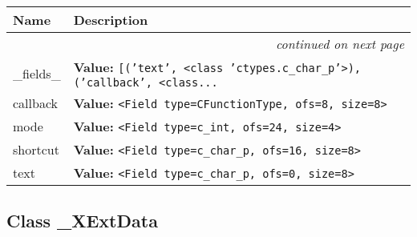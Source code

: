     \vspace{-1cm}
\hspace{\varindent}\begin{longtable}{|p{\varnamewidth}|p{\vardescrwidth}|l}
\cline{1-2}
\cline{1-2} \centering \textbf{Name} & \centering \textbf{Description}& \\
\cline{1-2}
\endhead\cline{1-2}\multicolumn{3}{r}{\small\textit{continued on next page}}\\\endfoot\cline{1-2}
\endlastfoot\raggedright \_\-f\-i\-e\-l\-d\-s\-\_\- & \raggedright \textbf{Value:} 
{\tt \texttt{[}\texttt{(}\texttt{'}\texttt{text}\texttt{'}\texttt{, }{\textless}class 'ctypes.c\_char\_p'{\textgreater}\texttt{)}\texttt{, }\texttt{(}\texttt{'}\texttt{callback}\texttt{'}\texttt{, }{\textless}class\texttt{...}}&\\
\cline{1-2}
\raggedright c\-a\-l\-l\-b\-a\-c\-k\- & \raggedright \textbf{Value:} 
{\tt {\textless}Field type=CFunctionType, ofs=8, size=8{\textgreater}}&\\
\cline{1-2}
\raggedright m\-o\-d\-e\- & \raggedright \textbf{Value:} 
{\tt {\textless}Field type=c\_int, ofs=24, size=4{\textgreater}}&\\
\cline{1-2}
\raggedright s\-h\-o\-r\-t\-c\-u\-t\- & \raggedright \textbf{Value:} 
{\tt {\textless}Field type=c\_char\_p, ofs=16, size=8{\textgreater}}&\\
\cline{1-2}
\raggedright t\-e\-x\-t\- & \raggedright \textbf{Value:} 
{\tt {\textless}Field type=c\_char\_p, ofs=0, size=8{\textgreater}}&\\
\cline{1-2}
\end{longtable}



\subsection{Class \_XExtData}

